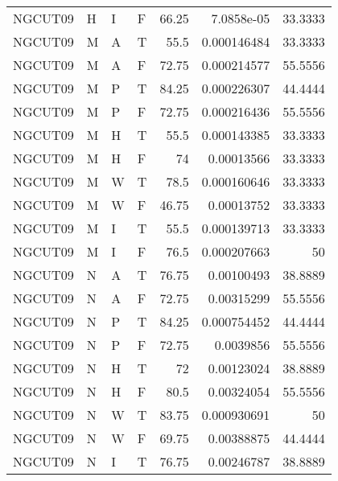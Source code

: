 \begin{longtable}{llllrrr}
    NGCUT09  & H         & I         & F          & 66.25      & 7.0858e-05  & 33.3333  \\
    NGCUT09  & M         & A         & T          & 55.5       & 0.000146484 & 33.3333  \\
    NGCUT09  & M         & A         & F          & 72.75      & 0.000214577 & 55.5556  \\
    NGCUT09  & M         & P         & T          & 84.25      & 0.000226307 & 44.4444  \\
    NGCUT09  & M         & P         & F          & 72.75      & 0.000216436 & 55.5556  \\
    NGCUT09  & M         & H         & T          & 55.5       & 0.000143385 & 33.3333  \\
    NGCUT09  & M         & H         & F          & 74         & 0.00013566  & 33.3333  \\
    NGCUT09  & M         & W         & T          & 78.5       & 0.000160646 & 33.3333  \\
    NGCUT09  & M         & W         & F          & 46.75      & 0.00013752  & 33.3333  \\
    NGCUT09  & M         & I         & T          & 55.5       & 0.000139713 & 33.3333  \\
    NGCUT09  & M         & I         & F          & 76.5       & 0.000207663 & 50       \\
    NGCUT09  & N         & A         & T          & 76.75      & 0.00100493  & 38.8889  \\
    NGCUT09  & N         & A         & F          & 72.75      & 0.00315299  & 55.5556  \\
    NGCUT09  & N         & P         & T          & 84.25      & 0.000754452 & 44.4444  \\
    NGCUT09  & N         & P         & F          & 72.75      & 0.0039856   & 55.5556  \\
    NGCUT09  & N         & H         & T          & 72         & 0.00123024  & 38.8889  \\
    NGCUT09  & N         & H         & F          & 80.5       & 0.00324054  & 55.5556  \\
    NGCUT09  & N         & W         & T          & 83.75      & 0.000930691 & 50       \\
    NGCUT09  & N         & W         & F          & 69.75      & 0.00388875  & 44.4444  \\
    NGCUT09  & N         & I         & T          & 76.75      & 0.00246787  & 38.8889  \\

\end{longtable}
